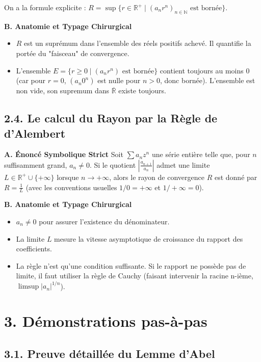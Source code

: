 \documentclass{report}
\begin{document}
On a la formule explicite : $R = \sup \{ r \in \mathbb{R}^+ \mid (a_n r^n)_{n \in \mathbb{N}} \text{ est bornée} \}$.

\textbf{B. Anatomie et Typage Chirurgical}
\begin{itemize}
\item $R$ est un suprémum dans l'ensemble des réels positifs achevé. Il quantifie la portée du "faisceau" de convergence.
\item L'ensemble $E = \{ r \geq 0 \mid (a_n r^n) \text{ est bornée} \}$ contient toujours au moins $0$ (car pour $r=0$, $(a_n 0^n)$ est nulle pour $n>0$, donc bornée). L'ensemble est non vide, son supremum dans $\overline{\mathbb{R}}$ existe toujours.
\end{itemize}

\subsection*{2.4. Le calcul du Rayon par la Règle de d'Alembert}

\textbf{A. Énoncé Symbolique Strict}
Soit $\sum a_n z^n$ une série entière telle que, pour $n$ suffisamment grand, $a_n \neq 0$.
Si le quotient $\left| \frac{a_{n+1}}{a_n} \right|$ admet une limite $L \in \mathbb{R}^+ \cup \{+\infty\}$ lorsque $n \to +\infty$, alors le rayon de convergence $R$ est donné par $R = \frac{1}{L}$ (avec les conventions usuelles $1/0 = +\infty$ et $1/+\infty = 0$).

\textbf{B. Anatomie et Typage Chirurgical}
\begin{itemize}
\item $a_n \neq 0$ pour assurer l'existence du dénominateur.
\item La limite $L$ mesure la vitesse asymptotique de croissance du rapport des coefficients.
\item La règle n'est qu'une condition suffisante. Si le rapport ne possède pas de limite, il faut utiliser la règle de Cauchy (faisant intervenir la racine n-ième, $\limsup |a_n|^{1/n}$).
\end{itemize}

\section*{3. Démonstrations pas-à-pas}

\subsection*{3.1. Preuve détaillée du Lemme d'Abel}
\end{document}

